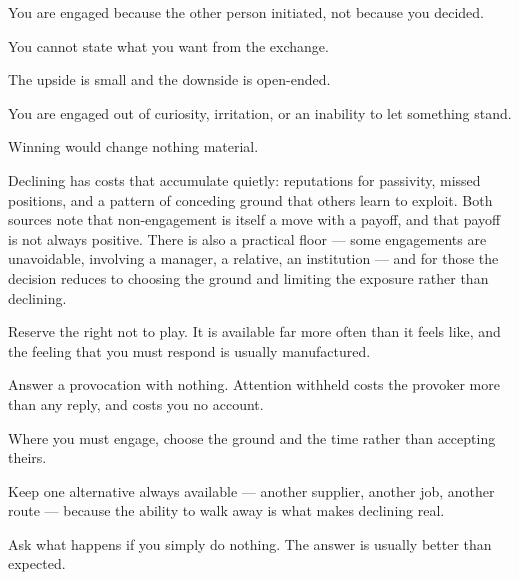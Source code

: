 \begin{feedback}
  \item You are engaged because the other person initiated, not because you decided.
  \item You cannot state what you want from the exchange.
  \item The upside is small and the downside is open-ended.
  \item You are engaged out of curiosity, irritation, or an inability to let something stand.
  \item Winning would change nothing material.
\end{feedback}

\begin{failure}
Declining has costs that accumulate quietly: reputations for passivity, missed positions, and a pattern of conceding ground that others learn to exploit. Both sources note that non-engagement is itself a move with a payoff, and that payoff is not always positive. There is also a practical floor --- some engagements are unavoidable, involving a manager, a relative, an institution --- and for those the decision reduces to choosing the ground and limiting the exposure rather than declining.
\end{failure}

\begin{countermeasures}
  \item Reserve the right not to play. It is available far more often than it feels like, and the feeling that you must respond is usually manufactured.
  \item Answer a provocation with nothing. Attention withheld costs the provoker more than any reply, and costs you no account.
  \item Where you must engage, choose the ground and the time rather than accepting theirs.
  \item Keep one alternative always available --- another supplier, another job, another route --- because the ability to walk away is what makes declining real.
  \item Ask what happens if you simply do nothing. The answer is usually better than expected.
\end{countermeasures}

\seesources
{}
